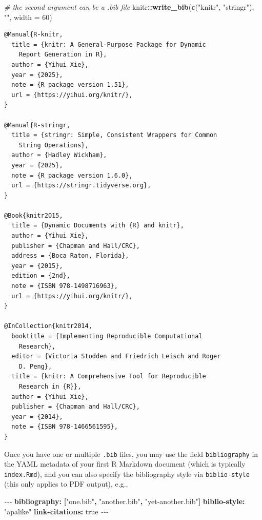 \documentclass[
  12pt,
]{krantz}
\newenvironment{Shaded}{\begin{snugshade}}{\end{snugshade}}
\newcommand{\AttributeTok}[1]{\textcolor[rgb]{0.13,0.29,0.53}{#1}}
\newcommand{\CharTok}[1]{\textcolor[rgb]{0.31,0.60,0.02}{#1}}
\newcommand{\CommentTok}[1]{\textcolor[rgb]{0.56,0.35,0.01}{\textit{#1}}}
\newcommand{\DecValTok}[1]{\textcolor[rgb]{0.00,0.00,0.81}{#1}}
\newcommand{\FunctionTok}[1]{\textcolor[rgb]{0.13,0.29,0.53}{\textbf{#1}}}
\newcommand{\KeywordTok}[1]{\textcolor[rgb]{0.13,0.29,0.53}{\textbf{#1}}}
\newcommand{\NormalTok}[1]{#1}
\newcommand{\PreprocessorTok}[1]{\textcolor[rgb]{0.56,0.35,0.01}{\textit{#1}}}
\newcommand{\SpecialCharTok}[1]{\textcolor[rgb]{0.81,0.36,0.00}{\textbf{#1}}}
\newcommand{\StringTok}[1]{\textcolor[rgb]{0.31,0.60,0.02}{#1}}
\theoremstyle{definition}
\theoremstyle{definition}
\theoremstyle{definition}
\theoremstyle{definition}
\theoremstyle{remark}
\begin{document}
\begin{Shaded}
\begin{Highlighting}[]
\CommentTok{\# the second argument can be a .bib file}
\NormalTok{knitr}\SpecialCharTok{::}\FunctionTok{write\_bib}\NormalTok{(}\FunctionTok{c}\NormalTok{(}\StringTok{"knitr"}\NormalTok{, }\StringTok{"stringr"}\NormalTok{), }\StringTok{""}\NormalTok{, }\AttributeTok{width =} \DecValTok{60}\NormalTok{)}
\end{Highlighting}
\end{Shaded}

\begin{verbatim}
@Manual{R-knitr,
  title = {knitr: A General-Purpose Package for Dynamic
    Report Generation in R},
  author = {Yihui Xie},
  year = {2025},
  note = {R package version 1.51},
  url = {https://yihui.org/knitr/},
}

@Manual{R-stringr,
  title = {stringr: Simple, Consistent Wrappers for Common
    String Operations},
  author = {Hadley Wickham},
  year = {2025},
  note = {R package version 1.6.0},
  url = {https://stringr.tidyverse.org},
}

@Book{knitr2015,
  title = {Dynamic Documents with {R} and knitr},
  author = {Yihui Xie},
  publisher = {Chapman and Hall/CRC},
  address = {Boca Raton, Florida},
  year = {2015},
  edition = {2nd},
  note = {ISBN 978-1498716963},
  url = {https://yihui.org/knitr/},
}

@InCollection{knitr2014,
  booktitle = {Implementing Reproducible Computational
    Research},
  editor = {Victoria Stodden and Friedrich Leisch and Roger
    D. Peng},
  title = {knitr: A Comprehensive Tool for Reproducible
    Research in {R}},
  author = {Yihui Xie},
  publisher = {Chapman and Hall/CRC},
  year = {2014},
  note = {ISBN 978-1466561595},
}
\end{verbatim}

Once you have one or multiple \texttt{.bib} files, you may use the field \texttt{bibliography} in the YAML metadata of your first R Markdown document (which is typically \texttt{index.Rmd}), and you can also specify the bibliography style via \texttt{biblio-style} (this only applies to PDF output), e.g.,

\begin{Shaded}
\begin{Highlighting}[]
\PreprocessorTok{{-}{-}{-}}
\FunctionTok{bibliography}\KeywordTok{:}\AttributeTok{ }\KeywordTok{[}\StringTok{"one.bib"}\KeywordTok{,}\AttributeTok{ }\StringTok{"another.bib"}\KeywordTok{,}\AttributeTok{ }\StringTok{"yet{-}another.bib"}\KeywordTok{]}
\FunctionTok{biblio{-}style}\KeywordTok{:}\AttributeTok{ }\StringTok{"apalike"}
\FunctionTok{link{-}citations}\KeywordTok{:}\AttributeTok{ }\CharTok{true}
\PreprocessorTok{{-}{-}{-}}
\end{Highlighting}
\end{Shaded}
\end{document}
